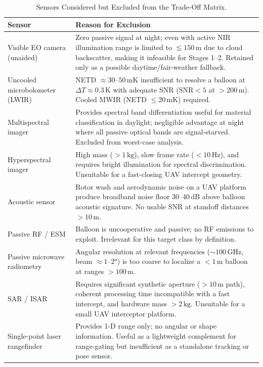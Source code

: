 \begin{table}[H]
\centering
\caption{Sensors Considered but Excluded from the Trade-Off Matrix.}
\label{tab:neglected_sensors}
\small
\begin{tabularx}{\textwidth}{l X}
\toprule
\textbf{Sensor} & \textbf{Reason for Exclusion} \\
\midrule

Visible EO camera (unaided)
  & Zero passive signal at night; even with active NIR illumination
    range is limited to $\lesssim\!150\,\text{m}$ due to cloud
    backscatter, making it infeasible for Stages 1–2. Retained only
    as a possible daytime/fair-weather fallback. \\[3pt]

Uncooled microbolometer (LWIR)
  & NETD $\approx 30$–$50\,\text{mK}$ insufficient to resolve a
    balloon at $\Delta T \approx 0.3\,\text{K}$ with adequate SNR
    ($\text{SNR} < 5$ at $> 200\,\text{m}$). Cooled MWIR
    (NETD $\leq 20\,\text{mK}$) required. \\[3pt]

Multispectral imager
  & Provides spectral band differentiation useful for material
    classification in daylight; negligible advantage at night where
    all passive optical bands are signal-starved. Excluded from
    worst-case analysis. \\[3pt]

Hyperspectral imager
  & High mass ($>1\,\text{kg}$), slow frame rate ($< 10\,\text{Hz}$),
    and requires bright illumination for spectral discrimination.
    Unsuitable for a fast-closing UAV intercept geometry. \\[3pt]

Acoustic sensor
  & Rotor wash and aerodynamic noise on a UAV platform produce
    broadband noise floor 30–40\,dB above balloon acoustic signature.
    No usable SNR at standoff distances $> 10\,\text{m}$. \\[3pt]

Passive RF / ESM
  & Balloon is uncooperative and passive; no RF emissions to exploit.
    Irrelevant for this target class by definition. \\[3pt]

Passive microwave radiometry
  & Angular resolution at relevant frequencies
    ($\sim 100\,\text{GHz}$, beam $\approx 1$–$2°$) is too coarse
    to localize a $<\!1\,\text{m}$ balloon at ranges $> 100\,\text{m}$. \\[3pt]

SAR / ISAR
  & Requires significant synthetic aperture ($>10\,\text{m}$ path),
    coherent processing time incompatible with a fast intercept, and
    hardware mass $> 2\,\text{kg}$. Unsuitable for a small UAV
    interceptor platform. \\[3pt]

Single-point laser rangefinder
  & Provides 1-D range only; no angular or shape information. Useful
    as a lightweight complement for range-gating but insufficient as
    a standalone tracking or pose sensor. \\

\bottomrule
\end{tabularx}
\end{table}

